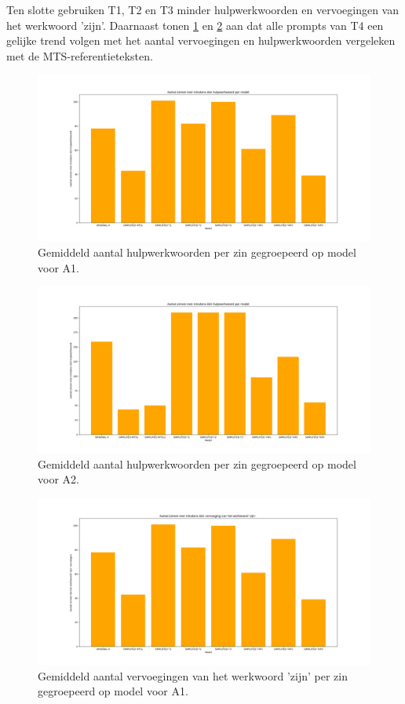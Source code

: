 Ten slotte gebruiken T1, T2 en T3 minder hulpwerkwoorden en vervoegingen van het werkwoord 'zijn'. Daarnaast tonen \ref{img:histplot-aux-a1} en \ref{img:histplot-aux-a2} aan dat alle prompts van T4 een gelijke trend volgen met het aantal vervoegingen en hulpwerkwoorden vergeleken met de MTS-referentieteksten.

\begin{figure}
	\includegraphics[width=\linewidth]{img/boxplot-aux-a1.png}
	\caption{Gemiddeld aantal hulpwerkwoorden per zin gegroepeerd op model voor A1.}
	\label{img:histplot-aux-a1}
\end{figure}

\begin{figure}
	\includegraphics[width=\linewidth]{img/boxplot-aux-a2.png}
	\caption{Gemiddeld aantal hulpwerkwoorden per zin gegroepeerd op model voor A2.}
	\label{img:histplot-aux-a2}
\end{figure}

\begin{figure}
	\includegraphics[width=\linewidth]{img/boxplot-tobe-a1.png}
	\caption{Gemiddeld aantal vervoegingen van het werkwoord 'zijn' per zin gegroepeerd op model voor A1.}
	\label{img:histplot-tobe-a1}
\end{figure}

